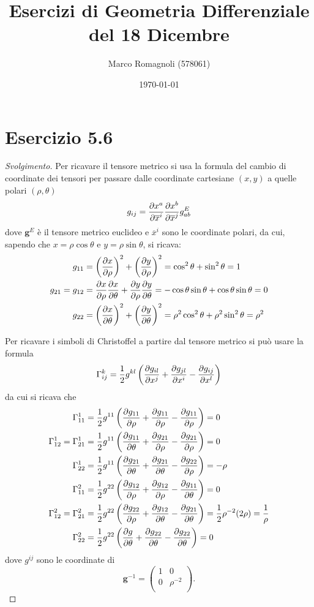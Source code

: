 \documentclass[italian,a4paper,10pt]{article}
\title{Esercizi di Geometria Differenziale\\ del 18 Dicembre}
\author{Marco Romagnoli (578061)}
\date{\today}
\begin{document}
\maketitle

\section*{Esercizio 5.6}
\begin{proof}[Svolgimento]
Per ricavare il tensore metrico si usa la formula del cambio di coordinate dei tensori per passare dalle coordinate cartesiane $(x,y)$ a quelle polari $(\rho,\theta)$ $$g_{ij} = \pdv{x^a}{\overline{x}^i} \pdv{x^b}{\overline{x}^j}g^E_{ab}$$ dove $\bm{g}^E$ è il tensore metrico euclideo e $\overline{x}^i$ sono le coordinate polari, da cui, sapendo che $x= \rho\cos{\theta}$ e $y= \rho\sin{\theta}$, si ricava:
\begin{align*}
g_{11} &= \left(\pdv{x}{\rho}\right)^2+\left(\pdv{y}{\rho}\right)^2 = \cos^2{\theta}+\sin^2{\theta} = 1\\
g_{21} = g_{12} &= \pdv{x}{\rho}\pdv{x}{\theta} + \pdv{y}{\rho}\pdv{y}{\theta} = -\cos{\theta}\sin{\theta} + \cos{\theta}\sin{\theta} = 0\\
g_{22} &= \left(\pdv{x}{\theta}\right)^2+\left(\pdv{y}{\theta}\right)^2 = \rho^2\cos^2{\theta}+\rho^2\sin^2{\theta} = \rho^2
\end{align*}

Per ricavare i simboli di Christoffel a partire dal tensore metrico si può usare la formula$$\Gamma^k_{ij} = \frac12 g^{kl}\left(\pdv{g_{il}}{x^j}+\pdv{g_{jl}}{x^i}-\pdv{g_{ij}}{x^l}\right)$$ da cui si ricava che
\begin{align*}
\Gamma^1_{11} &= \frac12 g^{11}\left(\pdv{g_{11}}{\rho}+\pdv{g_{11}}{\rho}-\pdv{g_{11}}{\rho}\right)=0\\
\Gamma^1_{12}=\Gamma^1_{21} &= \frac12 g^{11}\left(\pdv{g_{11}}{\theta}+\pdv{g_{21}}{\rho}-\pdv{g_{21}}{\rho}\right)=0\\
\Gamma^1_{22} &= \frac12 g^{11}\left(\pdv{g_{21}}{\theta}+\pdv{g_{21}}{\theta}-\pdv{g_{22}}{\rho}\right)=-\rho\\
\Gamma^2_{11} &= \frac12 g^{22}\left(\pdv{g_{12}}{\rho}+\pdv{g_{12}}{\rho}-\pdv{g_{11}}{\theta}\right)=0\\
\Gamma^2_{12}=\Gamma^2_{21} &= \frac12 g^{22}\left(\pdv{g_{22}}{\rho}+\pdv{g_{12}}{\theta}-\pdv{g_{21}}{\theta}\right)= \frac12 \rho^{-2} (2\rho) = \frac{1}{\rho}\\
\Gamma^2_{22} &= \frac12 g^{22}\left(\pdv{g_{}}{\theta}+\pdv{g_{22}}{\theta}-\pdv{g_{22}}{\theta}\right)=0
\end{align*} 
dove $g^{ij}$ sono le coordinate di 
\begin{equation*}
\bm{g}^{-1}= \begin{pmatrix}
1 & 0\\
0 & \rho^{-2}\\
\end{pmatrix}.
\end{equation*}


\end{proof}
\end{document}
